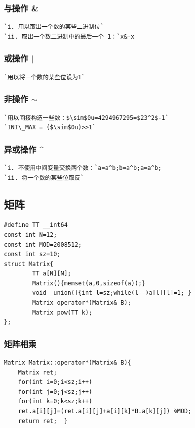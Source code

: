 \documentclass[a4paper]{article}
\begin{document}
\begin{CJK*}{UTF8}{gbsn}
\begin{multicols}{3}
\begin{flushleft}
\subsubsection{与操作 \&}
\begin{lstlisting}
`i. 用以取出一个数的某些二进制位`
`ii. 取出一个数二进制中的最后一个 1：`x&-x
\end{lstlisting}

\subsubsection{或操作 $|$}
\begin{lstlisting}
`用以将一个数的某些位设为1`
\end{lstlisting}

\subsubsection{非操作 $\sim$ }
\begin{lstlisting}
`用以间接构造一些数：$\sim$0u=4294967295=$23^2$-1`
`INI\_MAX = ($\sim$0u)>>1`
\end{lstlisting}


\subsubsection{异或操作 \^{}}
\begin{lstlisting}
`i. 不使用中间变量交换两个数：`a=a^b;b=a^b;a=a^b;
`ii. 将一个数的某些位取反`
\end{lstlisting}



\subsection{矩阵}
\begin{lstlisting}
#define TT __int64
const int N=12;
const int MOD=2008512;
const int sz=10;
struct Matrix{
		TT a[N][N];	
		Matrix(){memset(a,0,sizeof(a));}
		void _union(){int l=sz;while(l--)a[l][l]=1; }
		Matrix operator*(Matrix& B);
		Matrix pow(TT k); 
}; 
\end{lstlisting}


\subsubsection{矩阵相乘}
\begin{lstlisting}
Matrix Matrix::operator*(Matrix& B){
	Matrix ret;
	for(int i=0;i<sz;i++)
	for(int j=0;j<sz;j++)
	for(int k=0;k<sz;k++)
	ret.a[i][j]=(ret.a[i][j]+a[i][k]*B.a[k][j]) %MOD;
	return ret;  } 
\end{lstlisting}


\end{flushleft}
\end{multicols}
\end{CJK*}
\end{document}
